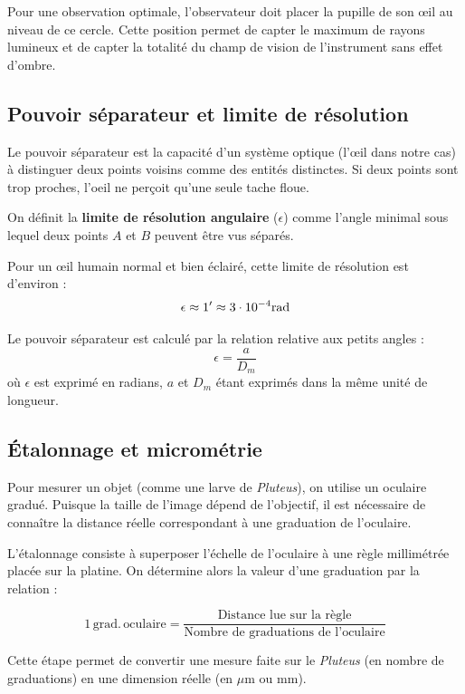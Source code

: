 Pour une observation optimale, 
l'observateur doit placer la pupille de son œil au niveau de ce cercle. 
Cette position permet de capter le maximum de rayons lumineux 
et de capter la totalité du champ de vision de l'instrument sans effet d'ombre.

\subsection{Pouvoir séparateur et limite de résolution}

Le pouvoir séparateur est la capacité d'un système optique 
(l'œil dans notre cas) à distinguer deux points voisins comme des entités distinctes. 
Si deux points sont trop proches, 
l'oeil ne perçoit qu'une seule tache floue.

On définit la \textbf{limite de résolution angulaire} ($\epsilon$) 
comme l'angle minimal sous lequel deux points $A$ et $B$ peuvent être vus séparés. 

Pour un œil humain normal et bien éclairé, 
cette limite de résolution est d'environ :
\begin{equation}
    \epsilon \approx 1' \approx 3 \cdot 10^{-4} \space \mathrm{rad}
\end{equation}

Le pouvoir séparateur est calculé par la relation relative aux petits angles :
\begin{equation}
    \label{eq:pouvoir_separation}
    \epsilon = \frac{a}{D_m}
\end{equation}
où $\epsilon$ est exprimé en radians,
$a$ et $D_m$ étant exprimés dans la même unité de longueur.

\subsection{Étalonnage et micrométrie}

Pour mesurer un objet (comme une larve de \textit{Pluteus}),
on utilise un oculaire gradué.
Puisque la taille de l'image dépend de l'objectif,
il est nécessaire de connaître la distance réelle correspondant à une graduation de l'oculaire.

L'étalonnage consiste à superposer l'échelle de l'oculaire
à une règle millimétrée placée sur la platine.
On détermine alors la valeur d'une graduation par la relation :

\begin{equation}
    1 \, \mathrm{grad. \, oculaire} = \frac{\text{Distance lue sur la règle}}{\text{Nombre de graduations de l'oculaire}}
\end{equation}

Cette étape permet de convertir une mesure faite sur le \textit{Pluteus} (en nombre de graduations)
en une dimension réelle (en $\mu\mathrm{m}$ ou $\mathrm{mm}$).